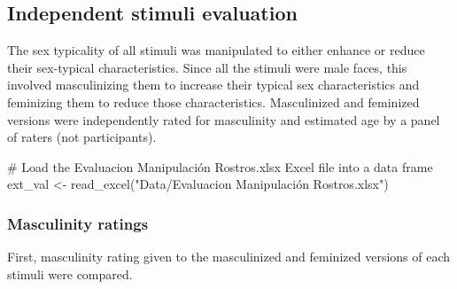 \documentclass[
  bookmarksnumbered]{article}
\newenvironment{Shaded}{\begin{snugshade}}{\end{snugshade}}
\newcommand{\CommentTok}[1]{\textcolor[rgb]{0.50,0.62,0.50}{#1}}
\newcommand{\FunctionTok}[1]{\textcolor[rgb]{0.94,0.94,0.56}{#1}}
\newcommand{\NormalTok}[1]{\textcolor[rgb]{0.80,0.80,0.80}{#1}}
\newcommand{\OtherTok}[1]{\textcolor[rgb]{0.94,0.94,0.56}{#1}}
\newcommand{\StringTok}[1]{\textcolor[rgb]{0.80,0.58,0.58}{#1}}
\begin{document}
\subsection{Independent stimuli evaluation}\label{independent-stimuli-evaluation}

The sex typicality of all stimuli was manipulated to either enhance or reduce their sex-typical characteristics. Since all the stimuli were male faces, this involved masculinizing them to increase their typical sex characteristics and feminizing them to reduce those characteristics. Masculinized and feminized versions were independently rated for masculinity and estimated age by a panel of raters (not participants).

\begin{Shaded}
\begin{Highlighting}[]
\CommentTok{\# Load the \textquotesingle{}Evaluacion Manipulación Rostros.xlsx\textquotesingle{} Excel file into a data frame}
\NormalTok{ext\_val }\OtherTok{\textless{}{-}} \FunctionTok{read\_excel}\NormalTok{(}\StringTok{"Data/Evaluacion Manipulación Rostros.xlsx"}\NormalTok{)}
\end{Highlighting}
\end{Shaded}

\subsubsection{Masculinity ratings}\label{masculinity-ratings}

First, masculinity rating given to the masculinized and feminized versions of each stimuli were compared.
\end{document}
